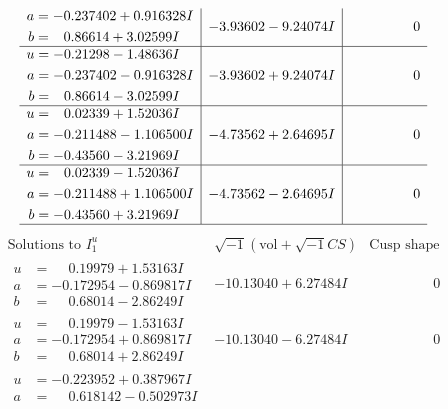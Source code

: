 \documentclass[1p]{elsarticle_modified}
\theoremstyle{definition}
\newcommand{\I}{\sqrt{-1}}
\begin{document}
$$\begin{array}{c|c|c}
\begin{aligned}
a &= -0.237402 + 0.916328 I \\
b &= \phantom{-}0.86614 + 3.02599 I\end{aligned}
 & -3.93602 - 9.24074 I & \phantom{-0.000000 } 0 \\ \hline\begin{aligned}
u &= -0.21298 - 1.48636 I \\
a &= -0.237402 - 0.916328 I \\
b &= \phantom{-}0.86614 - 3.02599 I\end{aligned}
 & -3.93602 + 9.24074 I & \phantom{-0.000000 } 0 \\ \hline\begin{aligned}
u &= \phantom{-}0.02339 + 1.52036 I \\
a &= -0.211488 - 1.106500 I \\
b &= -0.43560 - 3.21969 I\end{aligned}
 & -4.73562 + 2.64695 I & \phantom{-0.000000 } 0 \\ \hline\begin{aligned}
u &= \phantom{-}0.02339 - 1.52036 I \\
a &= -0.211488 + 1.106500 I \\
b &= -0.43560 + 3.21969 I\end{aligned}
 & -4.73562 - 2.64695 I & \phantom{-0.000000 } 0\\
 \hline 
 \end{array}$$\newpage$$\begin{array}{c|c|c}  
\text{Solutions to }I^u_{1}& \I (\text{vol} + \sqrt{-1}CS) & \text{Cusp shape}\\
 \hline 
\begin{aligned}
u &= \phantom{-}0.19979 + 1.53163 I \\
a &= -0.172954 - 0.869817 I \\
b &= \phantom{-}0.68014 - 2.86249 I\end{aligned}
 & -10.13040 + 6.27484 I & \phantom{-0.000000 } 0 \\ \hline\begin{aligned}
u &= \phantom{-}0.19979 - 1.53163 I \\
a &= -0.172954 + 0.869817 I \\
b &= \phantom{-}0.68014 + 2.86249 I\end{aligned}
 & -10.13040 - 6.27484 I & \phantom{-0.000000 } 0 \\ \hline\begin{aligned}
u &= -0.223952 + 0.387967 I \\
a &= \phantom{-}0.618142 - 0.502973 I \\

\end{aligned}
\end{array}$$
\end{document}
